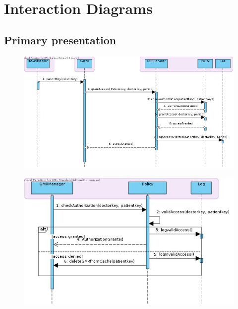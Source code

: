\documentclass[a4paper,10pt]{book}
\begin{document}
\section{Interaction Diagrams}

\subsection{Primary presentation}

\begin{center}
    \begin{figure}
      \includegraphics{../images/grantAccess.jpg}
    \end{figure}
  \end{center}

\begin{center}
    \begin{figure}
      \includegraphics{../images/lookupAccess.jpg}
    \end{figure}
  \end{center}
\end{document}
